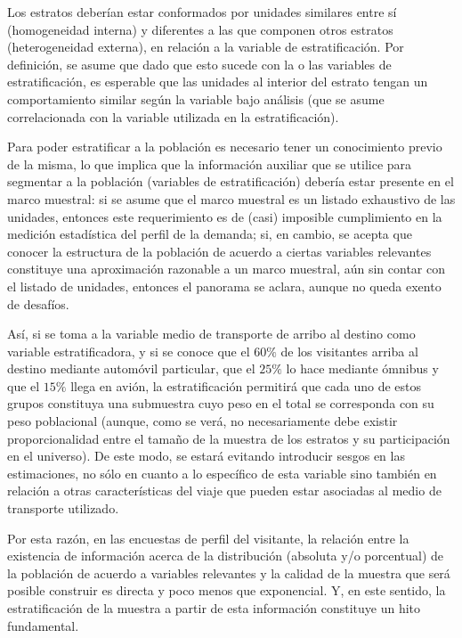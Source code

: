 \documentclass[
]{book}
\begin{document}
Los estratos deberían estar conformados por unidades similares entre sí (homogeneidad interna) y diferentes a las que componen otros estratos (heterogeneidad externa), en relación a la variable de estratificación. Por definición, se asume que dado que esto sucede con la o las variables de estratificación, es esperable que las unidades al interior del estrato tengan un comportamiento similar según la variable bajo análisis (que se asume correlacionada con la variable utilizada en la estratificación).

Para poder estratificar a la población es necesario tener un conocimiento previo de la misma, lo que implica que la información auxiliar que se utilice para segmentar a la población (variables de estratificación) debería estar presente en el marco muestral: si se asume que el marco muestral es un listado exhaustivo de las unidades, entonces este requerimiento es de (casi) imposible cumplimiento en la medición estadística del perfil de la demanda; si, en cambio, se acepta que conocer la estructura de la población de acuerdo a ciertas variables relevantes constituye una aproximación razonable a un marco muestral, aún sin contar con el listado de unidades, entonces el panorama se aclara, aunque no queda exento de desafíos.

Así, si se toma a la variable medio de transporte de arribo al destino como variable estratificadora, y si se conoce que el \(60\%\) de los visitantes arriba al destino mediante automóvil particular, que el \(25\%\) lo hace mediante ómnibus y que el \(15\%\) llega en avión, la estratificación permitirá que cada uno de estos grupos constituya una submuestra cuyo peso en el total se corresponda con su peso poblacional (aunque, como se verá, no necesariamente debe existir proporcionalidad entre el tamaño de la muestra de los estratos y su participación en el universo). De este modo, se estará evitando introducir sesgos en las estimaciones, no sólo en cuanto a lo específico de esta variable sino también en relación a otras características del viaje que pueden estar asociadas al medio de transporte utilizado.

Por esta razón, en las encuestas de perfil del visitante, la relación entre la existencia de información acerca de la distribución (absoluta y/o porcentual) de la población de acuerdo a variables relevantes y la calidad de la muestra que será posible construir es directa y poco menos que exponencial. Y, en este sentido, la estratificación de la muestra a partir de esta información constituye un hito fundamental.
\end{document}
